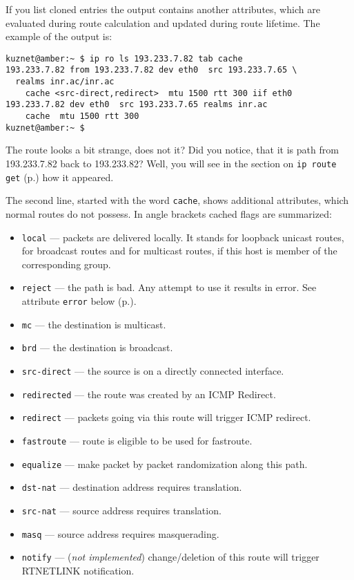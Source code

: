 If you list cloned entries the output contains another attributes, which
are evaluated during route calculation and updated during route
lifetime. The example of the output is:
\begin{verbatim}
kuznet@amber:~ $ ip ro ls 193.233.7.82 tab cache
193.233.7.82 from 193.233.7.82 dev eth0  src 193.233.7.65 \
  realms inr.ac/inr.ac 
    cache <src-direct,redirect>  mtu 1500 rtt 300 iif eth0
193.233.7.82 dev eth0  src 193.233.7.65 realms inr.ac 
    cache  mtu 1500 rtt 300
kuznet@amber:~ $
\end{verbatim}
\begin{NB}
  \label{NB-strange-route}
  The route looks a bit strange, does not it? Did you notice, that
  it is path from 193.233.7.82 back to 193.233.82? Well, you will
  see in the section on \verb|ip route get| (p.\pageref{NB-nature-of-strangeness})
  how it appeared.
\end{NB}
The second line, started with the word \verb|cache|, shows
additional attributes, which normal routes do not possess.
In angle brackets cached flags are summarized:
\begin{itemize}
\item \verb|local| --- packets are delivered locally.
It stands for loopback unicast routes, for broadcast routes
and for multicast routes, if this host is member of the corresponding
group.

\item \verb|reject| --- the path is bad. Any attempt to use it results
in error. See attribute \verb|error| below (p.\pageref{IP-ROUTE-GET-error}).

\item \verb|mc| --- the destination is multicast.

\item \verb|brd| --- the destination is broadcast.

\item \verb|src-direct| --- the source is on a directly connected
interface.

\item \verb|redirected| --- the route was created by an ICMP Redirect.

\item \verb|redirect| --- packets going via this route will 
trigger ICMP redirect.

\item \verb|fastroute| --- route is eligible to be used for fastroute.

\item \verb|equalize| --- make packet by packet randomization
along this path.

\item \verb|dst-nat| --- destination address requires translation.

\item \verb|src-nat| --- source address requires translation.

\item \verb|masq| --- source address requires masquerading.

\item \verb|notify| --- ({\em not implemented}) change/deletion
of this route will trigger RTNETLINK notification.
\end{itemize}

